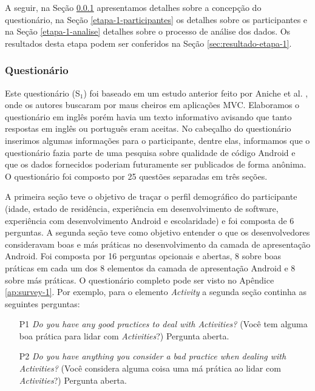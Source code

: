 A seguir, na Seção \ref{etapa-1-questionario} apresentamos detalhes sobre a concepção do questionário, na Seção \ref{etapa-1-participantes} os detalhes sobre os participantes e na Seção \ref{etapa-1-analise} detalhes sobre o processo de análise dos dados. Os resultados desta etapa podem ser conferidos na Seção \ref{sec:resultado-etapa-1}.



\subsubsection{Questionário}
\label{etapa-1-questionario}


Este questionário (S$_1$) foi baseado em um estudo anterior feito por Aniche et al. \cite{AnicheSmellsMVC:17, FinavaroAniche2016}, onde os autores buscaram por maus cheiros em aplicações \acs{MVC}. Elaboramos o questionário em inglês porém havia um texto informativo avisando que tanto respostas em inglês ou português eram aceitas. No cabeçalho do questionário inserimos algumas informações para o participante, dentre elas, informamos que o questionário fazia parte de uma pesquisa sobre qualidade de código Android e que os dados fornecidos poderiam futuramente ser publicados de forma anônima. O questionário foi composto por 25 questões separadas em três seções.

A primeira seção teve o objetivo de traçar o perfil demográfico do participante (idade, estado de residência, experiência em desenvolvimento de software, experiência com desenvolvimento Android e escolaridade) e foi composta de 6 perguntas. A segunda seção teve como objetivo entender o que os desenvolvedores consideravam boas e más práticas no desenvolvimento da camada de apresentação Android. Foi composta por 16 perguntas opcionais e abertas, 8 sobre boas práticas em cada um dos 8 elementos da camada de apresentação Android e 8 sobre más práticas. O questionário completo pode ser visto no Apêndice \ref{ap:survey-1}. Por exemplo, para o elemento \textit{Activity} a segunda seção continha as seguintes perguntas: 

\begin{itemize}
  \item[P1] \textit{Do you have any good practices to deal with Activities?} (Você tem alguma boa prática para lidar com \textit{Activities}?) Pergunta aberta.
  \item[P2] \textit{Do you have anything you consider a bad practice when dealing with Activities?} (Você considera alguma coisa uma má prática ao lidar com \textit{Activities}?) Pergunta aberta.
\end{itemize}

